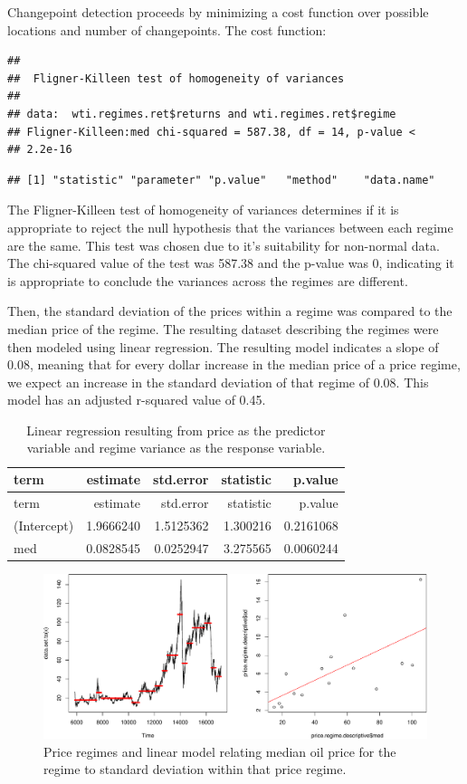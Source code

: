\documentclass[]{article}
\begin{document}
Changepoint detection proceeds by minimizing a cost function over
possible locations and number of changepoints. The cost function:

\begin{verbatim}
## 
##  Fligner-Killeen test of homogeneity of variances
## 
## data:  wti.regimes.ret$returns and wti.regimes.ret$regime
## Fligner-Killeen:med chi-squared = 587.38, df = 14, p-value <
## 2.2e-16
\end{verbatim}

\begin{verbatim}
## [1] "statistic" "parameter" "p.value"   "method"    "data.name"
\end{verbatim}

The Fligner-Killeen test of homogeneity of variances determines if it is
appropriate to reject the null hypothesis that the variances between
each regime are the same. This test was chosen due to it's suitability
for non-normal data. The chi-squared value of the test was 587.38 and
the p-value was 0, indicating it is appropriate to conclude the
variances across the regimes are different.

Then, the standard deviation of the prices within a regime was compared
to the median price of the regime. The resulting dataset describing the
regimes were then modeled using linear regression. The resulting model
indicates a slope of 0.08, meaning that for every dollar increase in the
median price of a price regime, we expect an increase in the standard
deviation of that regime of 0.08. This model has an adjusted r-squared
value of 0.45.

\begin{longtable}[]{@{}lrrrr@{}}
\caption{Linear regression resulting from price as the predictor
variable and regime variance as the response variable.}\tabularnewline
\toprule
term & estimate & std.error & statistic & p.value\tabularnewline
\midrule
\endfirsthead
\toprule
term & estimate & std.error & statistic & p.value\tabularnewline
\midrule
\endhead
(Intercept) & 1.9666240 & 1.5125362 & 1.300216 &
0.2161068\tabularnewline
med & 0.0828545 & 0.0252947 & 3.275565 & 0.0060244\tabularnewline
\bottomrule
\end{longtable}

\begin{figure}[htbp]
\centering
\includegraphics{Figs/unnamed-chunk-16-1.pdf}
\caption{Price regimes and linear model relating median oil price for
the regime to standard deviation within that price regime.}
\end{figure}
\end{document}
